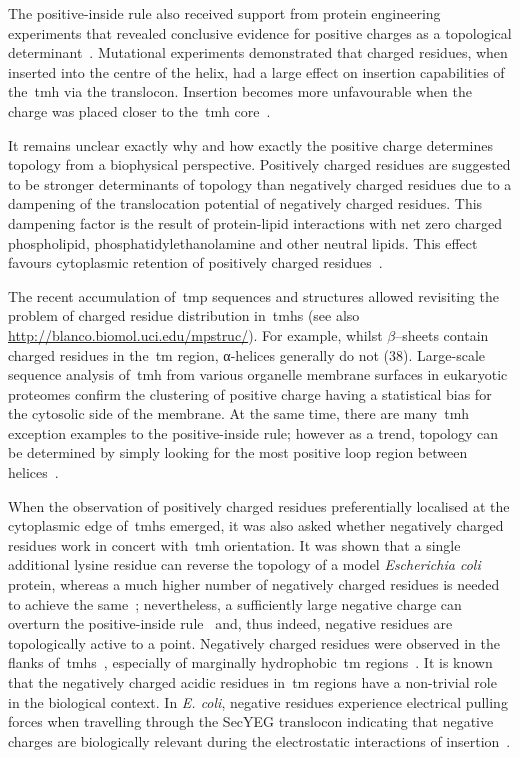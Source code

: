 The positive-inside rule also received support from protein engineering experiments that revealed conclusive evidence for positive charges as a topological determinant~\cite{VonHeijne1989, Beltzer1991, Kida2006, Nilsson1990}.
Mutational experiments demonstrated that charged residues, when inserted into the centre of the helix, had a large effect on insertion capabilities of the~\gls{tmh} via the translocon.
Insertion becomes more unfavourable when the charge was placed closer to the~\gls{tmh} core~\cite{Hessa2005}.

It remains unclear exactly why and how exactly the positive charge determines topology from a biophysical perspective.
Positively charged residues are suggested to be stronger determinants of topology than negatively charged residues due to a dampening of the translocation potential of negatively charged residues.
This dampening factor is the result of protein-lipid interactions with net zero charged phospholipid, phosphatidylethanolamine and other neutral lipids.
This effect favours cytoplasmic retention of positively charged residues~\cite{Bogdanov2014}.

The recent accumulation of~\gls{tmp} sequences and structures allowed revisiting the problem of charged residue distribution in~\gls{tmh}s (see also \url{http://blanco.biomol.uci.edu/mpstruc/}).
For example, whilst \(\beta\)--sheets contain charged residues in the~\gls{tm} region, α-helices generally do not (38).
Large-scale sequence analysis of~\gls{tmh} from various organelle membrane surfaces in eukaryotic proteomes confirm the clustering of positive charge having a statistical bias for the cytosolic side of the membrane.
At the same time, there are many~\gls{tmh} exception examples to the positive-inside rule; however as a trend, topology can be determined by simply looking for the most positive loop region between helices~\cite{Sharpe2010, Baeza-Delgado2013}.

When the observation of positively charged residues preferentially localised at the cytoplasmic edge of~\gls{tmh}s emerged, it was also asked whether negatively charged residues work in concert with~\gls{tmh} orientation.
It was shown that a single additional lysine residue can reverse the topology of a model \textit{Escherichia coli} protein, whereas a much higher number of negatively charged residues is needed to achieve the same~\cite{Nilsson1990}; nevertheless, a sufficiently large negative charge can overturn the positive-inside rule~\cite{Andersson1993, Kim1994} and, thus indeed, negative residues are topologically active to a point.
Negatively charged residues were observed in the flanks of~\gls{tmh}s~\cite{Baeza-Delgado2013}, especially of marginally hydrophobic~\gls{tm} regions~\cite{Delgado-Partin1998}.
It is known that the negatively charged acidic residues in~\gls{tm} regions have a non-trivial role in the biological context.
In \textit{E.
coli}, negative residues experience electrical pulling forces when travelling through the SecYEG translocon indicating that negative charges are biologically relevant during the electrostatic interactions of insertion~\cite{Ismail2012, Ismail2015}.

